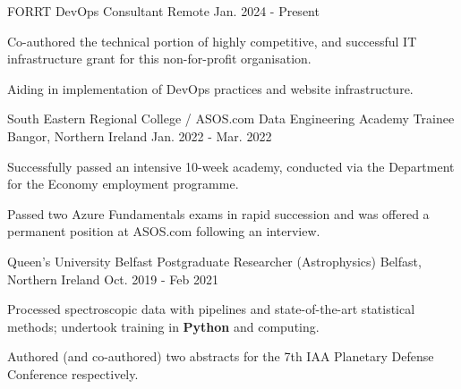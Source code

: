 \begin{cventries}
  \cventry
  	{FORRT} %
    {DevOps Consultant} %
    {Remote} %
    {Jan. 2024 - Present} %
    {
    \begin{cvitems}
		\item {Co-authored the technical portion of highly competitive, and successful IT infrastructure grant for this non-for-profit organisation.}
		\item {Aiding in implementation of DevOps practices and website infrastructure.}
     \end{cvitems}
    }

  \cventry
  	{South Eastern Regional College / ASOS.com} %
    {Data Engineering Academy Trainee} %
    {Bangor, Northern Ireland} %
    {Jan. 2022 - Mar. 2022} %
    {
      \begin{cvitems} %
        \item {Successfully passed an intensive 10-week academy, conducted via the Department for the Economy employment programme.}
        \item {Passed two Azure Fundamentals exams in rapid succession and was offered a permanent position at ASOS.com following an interview.}
      \end{cvitems}
    }

  \cventry
    {Queen's University Belfast} %
    {Postgraduate Researcher (Astrophysics)} %
    {Belfast, Northern Ireland} %
    {Oct. 2019 - Feb 2021} %
    {
      \begin{cvitems} %
        \item {Processed spectroscopic data with pipelines and state-of-the-art statistical methods; undertook training in \textbf{Python} and computing.}
        \item {Authored (and co-authored) two abstracts for the 7th IAA Planetary Defense Conference respectively.}
      \end{cvitems}
    }
    

\end{cventries}
